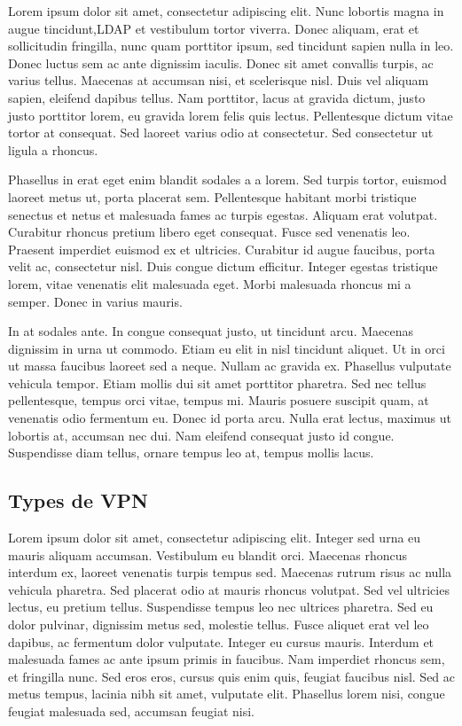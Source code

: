\documentclass[a4paper,12pt]{report}
\begin{document}

Lorem ipsum dolor sit amet, consectetur adipiscing elit. Nunc lobortis magna in augue tincidunt,\ac{LDAP} et vestibulum tortor viverra. Donec aliquam, erat et sollicitudin fringilla, nunc quam porttitor ipsum, sed tincidunt sapien nulla in leo. Donec luctus sem ac ante dignissim iaculis. Donec sit amet convallis turpis, ac varius tellus. Maecenas at accumsan nisi, et scelerisque nisl. Duis vel aliquam sapien, eleifend dapibus tellus. Nam porttitor, lacus at gravida dictum, justo justo porttitor lorem, eu gravida lorem felis quis lectus. Pellentesque dictum vitae tortor at consequat. Sed laoreet varius odio at consectetur. Sed consectetur ut ligula a rhoncus.

Phasellus in erat eget enim blandit sodales a a lorem. Sed turpis tortor, euismod laoreet metus ut, porta placerat sem. Pellentesque habitant morbi tristique senectus et netus et malesuada fames ac turpis egestas. Aliquam erat volutpat. Curabitur rhoncus pretium libero eget consequat. Fusce sed venenatis leo. Praesent imperdiet euismod ex et ultricies. Curabitur id augue faucibus, porta velit ac, consectetur nisl. Duis congue dictum efficitur. Integer egestas tristique lorem, vitae venenatis elit malesuada eget. Morbi malesuada rhoncus mi a semper. Donec in varius mauris.

In at sodales ante. In congue consequat justo, ut tincidunt arcu. Maecenas dignissim in urna ut commodo. Etiam eu elit in nisl tincidunt aliquet. Ut in orci ut massa faucibus laoreet sed a neque. Nullam ac gravida ex. Phasellus vulputate vehicula tempor. Etiam mollis dui sit amet porttitor pharetra. Sed nec tellus pellentesque, tempus orci vitae, tempus mi. Mauris posuere suscipit quam, at venenatis odio fermentum eu. Donec id porta arcu. Nulla erat lectus, maximus ut lobortis at, accumsan nec dui. Nam eleifend consequat justo id congue. Suspendisse diam tellus, ornare tempus leo at, tempus mollis lacus.

\subsection{Types de \ac{VPN}} %
Lorem ipsum dolor sit amet, consectetur adipiscing elit. Integer sed urna eu mauris aliquam accumsan. Vestibulum eu blandit orci. Maecenas rhoncus interdum ex, laoreet venenatis turpis tempus sed. Maecenas rutrum risus ac nulla vehicula pharetra. Sed placerat odio at mauris rhoncus volutpat. Sed vel ultricies lectus, eu pretium tellus. Suspendisse tempus leo nec ultrices pharetra. Sed eu dolor pulvinar, dignissim metus sed, molestie tellus. Fusce aliquet erat vel leo dapibus, ac fermentum dolor vulputate. Integer eu cursus mauris. Interdum et malesuada fames ac ante ipsum primis in faucibus. Nam imperdiet rhoncus sem, et fringilla nunc. Sed eros eros, cursus quis enim quis, feugiat faucibus nisl. Sed ac metus tempus, lacinia nibh sit amet, vulputate elit. Phasellus lorem nisi, congue feugiat malesuada sed, accumsan feugiat nisi.
\end{document}
